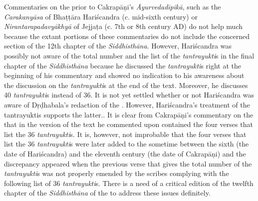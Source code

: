 Commentaries on the \CS prior to Cakrapāṇi's \emph{Āyurvedadīpikā}, such as the \emph{Carakanyāsa} of Bhaṭṭāra Hariścandra (c. mid-sixth century) or \emph{Nirantarapadavyākhyā} of Jejjaṭa (c. 7th or 8th century AD) do not help much because the extant portions of these commentaries do not include the concerned section of the 12th chapter of the \emph{Siddhisthāna}. However, Hariścandra was possibly not aware of the total number and the list of the \emph{tantrayukti}s in the final chapter of the \emph{Siddhisthāna} because he discussed the \emph{tantrayukti}s right at the beginning of his commentary and showed no indication to his awareness about the discussion on the \emph{tantrayukti}s at the end of the text. Moreover, he discusses 40 \emph{tantrayukti}s instead of 36. It is not yet settled whether or not Hariścandra was aware of Dṛḍhabala's redaction of the \CS. However, Hariścandra's treatment of the tantrayuktis supports the latter..  It is clear from Cakrapāṇi's commentary on the \CS that in the version of the text he commented upon contained the four verses that list the 36 \emph{tantrayukti}s. It is, however, not improbable that the four verses that list the 36 \emph{tantrayukti}s were later added to the \CS sometime between the sixth (the date of Hariścandra) and the eleventh century (the date of Cakrapāṇi) and the discrepancy appeared when the previous verse that gives the total number of the \emph{tantrayukti}s was not properly emended by the scribes complying with the following list of 36 \emph{tantrayukti}s. There is a need of a critical edition of the twelfth chapter of the \emph{Siddhisthāna} of the \CS to address these issues definitely.  

